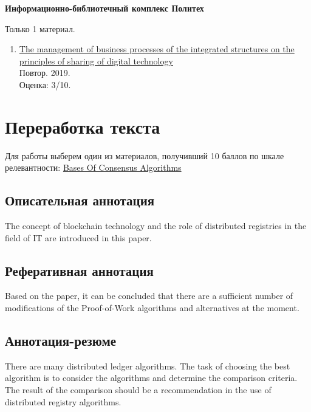 \documentclass[a4paper, 12pt]{report}		%
\begin{document}
\textbf{Информационно-библиотечный комплекс Политех}

Только 1 материал.

\begin{enumerate}
\item \href{https://ruslan.library.spbstu.ru/pwb/detail?db=ANALITS2005&id=8c229831-1a03-4873-b151-28e250859458}{The management of business processes of the integrated structures on the principles of sharing of digital technology}\\
Повтор. 2019.\\
Оценка: 3/10.
\end{enumerate}

\section*{Переработка текста}


Для работы выберем один из материалов, получивший 10 баллов по шкале релевантности: \href{https://www.kgmtu.ru/documents/nauka/SbornikEng2020.pdf#page=211}{Bases Of Consensus Algorithms}

\subsection*{Описательная аннотация}
The concept of blockchain technology and the role of distributed registries in the field of IT are introduced in this paper.

\subsection*{Реферативная аннотация}
Based on the paper, it can be concluded that there are a sufficient number of modifications of the Proof-of-Work algorithms and alternatives at the moment.

\subsection*{Аннотация-резюме}
There are many distributed ledger algorithms. The task of choosing the best algorithm is to consider the algorithms and determine the comparison criteria. The result of the comparison should be a recommendation in the use of distributed registry algorithms.
\end{document}
